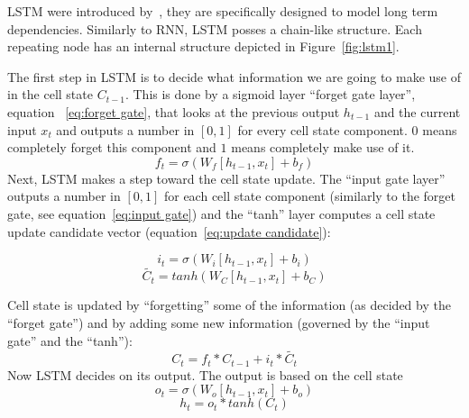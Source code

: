 LSTM were introduced by~\cite{hochreiter1997long}, they are
specifically designed to model long term dependencies. Similarly to
RNN, LSTM posses a chain-like structure. Each repeating node has an
internal structure depicted in Figure~\ref{fig:lstm1}.

The first step in LSTM is to decide what information we are going to
make use of in the cell state $C_{t-1}$.  This is done by a sigmoid
layer ``forget gate layer'', equation ~\ref{eq:forget gate}, that
looks at the previous output $h_{t-1}$ and the current input $x_t$ and
outputs a number in $[0,1]$ for every cell state component. $0$ means
completely forget this component and $1$ means completely make use of
it.
\begin{equation}\label{eq:forget gate}
  f_t = \sigma(W_f[h_{t-1}, x_t] + b_f)
\end{equation}
Next, LSTM makes a step toward the cell state update. The ``input gate
layer'' outputs a number in $[0,1]$ for each cell state component
(similarly to the forget gate, see equation~\ref{eq:input gate}) and
the ``tanh'' layer computes a cell state update candidate vector
(equation~\ref{eq:update candidate}):

\begin{equation}\label{eq:input gate}
  i_t = \sigma(W_i[h_{t-1},x_t] + b_i)
\end{equation}
\begin{equation}\label{eq:update candidate}
  \tilde{C_t} = tanh(W_C[h_{t-1},x_t] + b_C)
\end{equation}

Cell state is updated by ``forgetting'' some of the information (as
decided by the ``forget gate'') and by adding some new information
(governed by the ``input gate'' and the ``tanh''):
\begin{equation}
  C_t = f_t*C_{t-1}+i_t*\tilde{C_t}
\end{equation}
Now LSTM decides on its output.  The output is based on the cell state
\begin{equation}
  o_t = \sigma(W_o[h_{t-1},x_t]+b_o)
\end{equation}
\begin{equation}
  h_t = o_t*tanh(C_t)
\end{equation}

